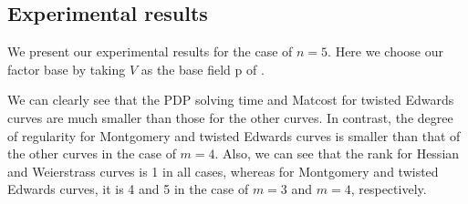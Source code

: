 \subsection{Experimental results}
%
\label{sec:experiment-result}

We present our experimental results for the case of $n=5$.
%
Here we choose our factor base by taking $V$ as the base field \F p of
.
%


We can clearly see that the PDP solving time and Matcost for twisted
Edwards curves are much smaller than those for the other curves.
%
In contrast, the degree of regularity for Montgomery and twisted
Edwards curves is smaller than that of the other curves in the case of
$m=4$.
%
Also, we can see that the rank for Hessian and Weierstrass curves is 1
in all cases, whereas for Montgomery and twisted Edwards curves, it is
4 and 5 in the case of $m=3$ and $m=4$, respectively.
%







